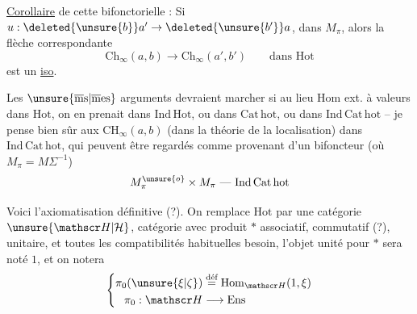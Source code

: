\uline{Corollaire} de cette  bifonctorielle : Si $u:\deleted{\unsure{b}}a'\to\deleted{\unsure{b'}}a$,    dans $M_{\pi}$, alors la flèche correspondante
\[
\mathrm{Ch}_{\infty}(a,b)\longrightarrow\mathrm{Ch}_{\infty}(a',b')\qquad\text{dans Hot}
\]
est un \uline{iso}.

Les $\unsure{\overline{\mathrm m}\mathrm s|\overline{\mathrm m}\mathrm e\mathrm s}$ arguments devraient marcher si au lieu  $\mathrm{Hom}$ ext. à valeurs dans $\mathrm{Hot}$, on en prenait dans $\mathrm{Ind}\,\mathrm{Hot}$, ou dans $\mathrm{Cat}\,\mathrm{hot}$, ou dans $\mathrm{Ind}\,\mathrm{Cat}\,\mathrm{hot}$ -- je pense bien sûr aux $\mathrm{CH}_{\infty}(a,b)$ (dans la théorie de la localisation) dans $\mathrm{Ind}\,\mathrm{Cat}\,\mathrm{hot}$, qui  peuvent être regardés comme provenant d'un bifoncteur (où $M_{\pi}=M\Sigma^{-1}$)
\[
M_{\pi}^{\unsure{o}}\times M_{\pi}\ \text{---}\ \mathrm{Ind}\,\mathrm{Cat}\,\mathrm{hot}
\]

Voici l'axiomatisation définitive (?). On remplace $\mathrm{Hot}$ par une catégorie
$\unsure{\mathscr H|\mathcal H}$, catégorie avec produit $*$ associatif,  commutatif (?), unitaire, et toutes les compatibilités habituelles  besoin,
l'objet unité pour $*$ sera noté $1$, et on notera
\[
\left\{\begin{aligned}
\pi_0(\unsure{\xi|\zeta})&\overset{\text{déf}}{=}\mathrm{Hom}_{\mathscr H}(1,\xi)\\
\pi_0:\mathscr H&\longrightarrow\mathrm{Ens}
\end{aligned}\right.
\]

